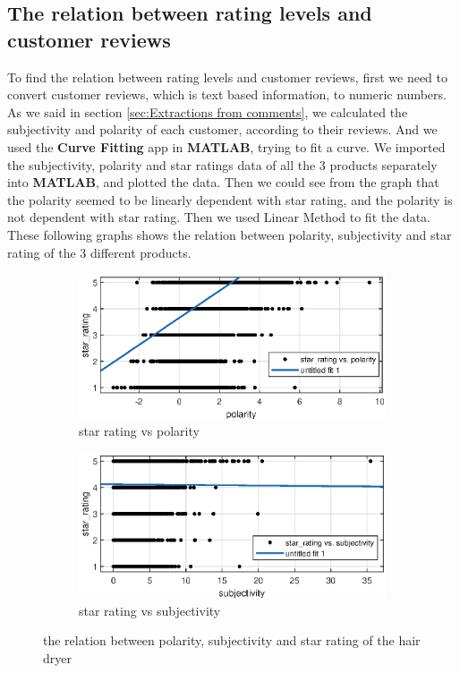 \documentclass[12pt]{article}  %
\begin{document}
\subsection{The relation between rating levels and customer reviews}

To find the relation between rating levels and customer reviews, first we need to convert customer reviews, which is text based information, to numeric numbers. As we said in section \ref{sec:Extractions from comments}, we calculated the subjectivity and polarity of each customer, according to their reviews. And we used the \textbf{Curve Fitting} app in \textbf{MATLAB}, trying to fit a curve.
We imported the subjectivity, polarity and star ratings data of all the 3 products separately into \textbf{MATLAB}, and plotted the data. Then we could see from the graph that the polarity seemed to be linearly dependent with star rating, and the polarity is not dependent with star rating.
Then we used Linear Method to fit the data. These following graphs shows the relation between polarity, subjectivity and star rating of the 3 different products.
\begin{figure}[H]
  \centering
  \begin{subfigure}{.5\textwidth}
    \centering
    \includegraphics[width=\linewidth]{figures/hair_dryer/polarity_vs_star_rating.eps}
    \caption{star rating vs polarity}
    \label{fig:}
  \end{subfigure}%
  \begin{subfigure}{.5\textwidth}
    \centering
    \includegraphics[width=\linewidth]{figures/hair_dryer/subjectivity_vs_star_rating.eps}
    \caption{star rating vs subjectivity}
    \label{fig:}
  \end{subfigure}
  \caption{the relation between polarity, subjectivity and star rating of the hair dryer}
  \label{fig:}
\end{figure}
\end{document}
